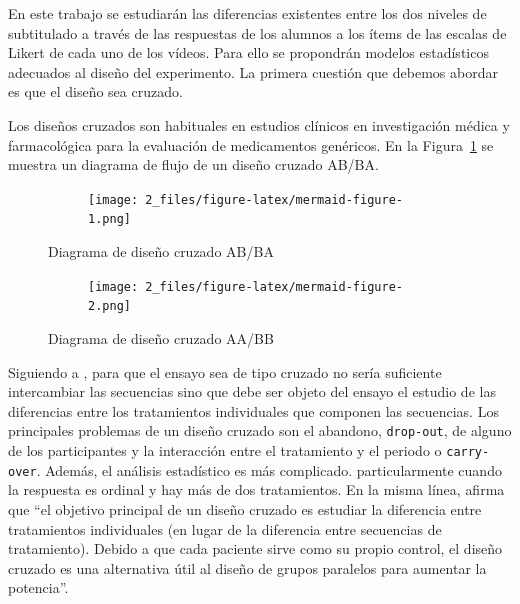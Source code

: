 \documentclass[
  12pt,
  a4paper,
  extrafontsizes,
  onecolumn,
  openright,
  table]{memoir}
\begin{document}
En este trabajo se estudiarán las diferencias existentes entre los dos
niveles de subtitulado a través de las respuestas de los alumnos a los
ítems de las escalas de Likert de cada uno de los vídeos. Para ello se
propondrán modelos estadísticos adecuados al diseño del experimento. La
primera cuestión que debemos abordar es que el diseño sea cruzado.

Los diseños cruzados son habituales en estudios clínicos en
investigación médica \autocite[ver][]{lim2021} y farmacológica para la
evaluación de medicamentos genéricos. En la Figura~\ref{fig-ab-ba} se
muestra un diagrama de flujo de un diseño cruzado AB/BA.

\begin{figure}

{\centering 

\begin{figure}[H]

{\centering \texttt{[image: 2\_files/figure-latex/mermaid-figure-1.png]}

}

\end{figure}

}

\caption{\label{fig-ab-ba}Diagrama de diseño cruzado AB/BA}

\end{figure}

\begin{figure}

{\centering 

\begin{figure}[H]

{\centering \texttt{[image: 2\_files/figure-latex/mermaid-figure-2.png]}

}

\end{figure}

}

\caption{\label{fig-aa-bb}Diagrama de diseño cruzado AA/BB}

\end{figure}

Siguiendo a \textcite{senn2022}, para que el ensayo sea de tipo cruzado
no sería suficiente intercambiar las secuencias sino que debe ser objeto
del ensayo el estudio de las diferencias entre los tratamientos
individuales que componen las secuencias. Los principales problemas de
un diseño cruzado son el abandono, \texttt{drop-out}, de alguno de los
participantes y la interacción entre el tratamiento y el periodo o
\texttt{carry-over}. Además, el análisis estadístico es más complicado.
particularmente cuando la respuesta es ordinal y hay más de dos
tratamientos. En la misma línea, \textcite{lui2016} afirma que
\enquote{el objetivo principal de un diseño cruzado es estudiar la
diferencia entre tratamientos individuales (en lugar de la diferencia
entre secuencias de tratamiento). Debido a que cada paciente sirve como
su propio control, el diseño cruzado es una alternativa útil al diseño
de grupos paralelos para aumentar la potencia}.
\end{document}
